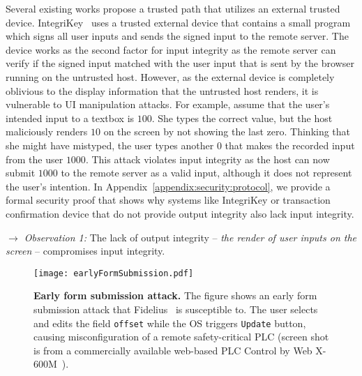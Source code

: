  Several existing works propose a trusted path that utilizes an external trusted device. IntegriKey~\cite{IntegriKey} uses a trusted external device that contains a small program which signs all user inputs and sends the signed input to the remote server. The device works as the second factor for input integrity as the remote server can verify if the signed input matched with the user input that is sent by the browser running on the untrusted host. However, as the external device is completely oblivious to the display information that the untrusted host renders, it is vulnerable to UI manipulation attacks. For example, assume that the user's intended input to a textbox is $100$. She types the correct value, but the host maliciously renders $10$ on the screen by not showing the last zero. Thinking that she might have mistyped, the user types another $0$ that makes the recorded input from the user $1000$. This attack violates input integrity as the host can now submit $1000$ to the remote server as a valid input, although it does not represent the user's intention. In Appendix~\ref{appendix:security:protocol}, we provide a formal security proof that shows why systems like IntegriKey or transaction confirmation device that do not provide output integrity also lack input integrity.

\noindent\emph{$\rightarrow$ Observation 1:} The lack of output integrity -- \emph{the render of user inputs on the screen} -- compromises input integrity.

\begin{figure}[t]
\centering
\texttt{[image: earlyFormSubmission.pdf]}
\caption{\textbf{Early form submission attack.} The figure shows an early form submission attack that Fidelius~\cite{Fidelius} is susceptible to. The user selects and edits the field \texttt{offset} while the OS triggers \texttt{Update} button, causing misconfiguration of a remote safety-critical PLC (screen shot is from a commercially available web-based PLC Control by Web X-600M~\cite{controlbyweb}).}
\spacesave
\label{fig:clickJack}
\centering 
\end{figure}


